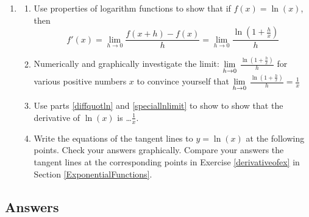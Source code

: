 \begin{enumerate}
\setcounter{enumi}{\value{HW}}



\item\label{derivativeofln} \begin{enumerate}  \item\label{diffquotln}  Use properties of logarithm functions to show that if $f(x) = \ln(x)$, then \[ f'(x) = \lim_{h \rightarrow 0} \frac{f(x+h) - f(x)}{h} = \lim_{h \rightarrow 0} \dfrac{\ln\left( 1 + \frac{h}{x} \right)}{h} \]

\item\label{speciallnlimit}    Numerically and graphically investigate the limit: $\displaystyle{\lim_{h \rightarrow 0}}$ $\frac{\ln\left( 1 + \frac{h}{x} \right)}{h}$ for various positive numbers $x$ to convince yourself that   $\displaystyle{\lim_{h \rightarrow 0}}$ $\frac{\ln\left( 1 + \frac{h}{x} \right)}{h} = \frac{1}{x}$

\item  Use parts \ref{diffquotln} and \ref{speciallnlimit} to show to show that the derivative of $\ln(x)$ is \ldots  $\frac{1}{x}$.

\item  Write the equations of the tangent lines to $y = \ln(x) $ at the following points.   Check your answers graphically.  Compare your answers the tangent lines at the corresponding points in Exercise \ref{derivativeofex} in Section \ref{ExponentialFunctions}.


\begin{enumerate}


\end{enumerate}

\end{enumerate}

\setcounter{HW}{\value{enumi}}
\end{enumerate}




\newpage

\subsection{Answers}


